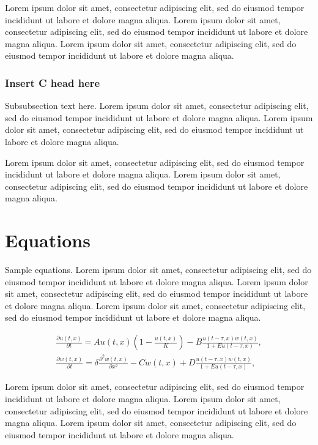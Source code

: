 \documentclass[
  journal=medium,
  manuscript=article-type,
  year=2020,
  volume=37,
]{cup-journal}
\begin{document}
 Lorem ipsum dolor sit amet, consectetur adipiscing elit, sed do eiusmod tempor incididunt ut labore et dolore magna aliqua. Lorem ipsum dolor sit amet, consectetur adipiscing elit, sed do eiusmod tempor incididunt ut labore et dolore magna aliqua. Lorem ipsum dolor sit amet, consectetur adipiscing elit, sed do eiusmod tempor incididunt ut labore et dolore magna aliqua. 

\subsubsection{Insert C head here}
Subsubsection text here. Lorem ipsum dolor sit amet, consectetur adipiscing elit, sed do eiusmod tempor incididunt ut labore et dolore magna aliqua. 
Lorem ipsum dolor sit amet, consectetur adipiscing elit, sed do eiusmod tempor incididunt ut labore et dolore magna aliqua. 

Lorem ipsum dolor sit amet, consectetur adipiscing elit, sed do eiusmod tempor incididunt ut labore et dolore magna aliqua. Lorem ipsum dolor sit amet, consectetur adipiscing elit, sed do eiusmod tempor incididunt ut labore et dolore magna aliqua. 

\section{Equations}

Sample equations. Lorem ipsum dolor sit amet, consectetur adipiscing elit, sed do eiusmod tempor incididunt ut labore et dolore magna aliqua. Lorem ipsum dolor sit amet, consectetur adipiscing elit, sed do eiusmod tempor incididunt ut labore et dolore magna aliqua. Lorem ipsum dolor sit amet, consectetur adipiscing elit, sed do eiusmod tempor incididunt ut labore et dolore magna aliqua. 


\begin{equation}
\begin{aligned}\label{eq:first}
\frac{\partial u(t,x)}{\partial t} = Au(t,x) \left(1-\frac{u(t,x)}{K}\right)
 -B\frac{u(t-\tau,x) w(t,x)}{1+Eu(t-\tau,x)},\\
\frac{\partial w(t,x)}{\partial t} =\delta \frac{\partial^2w(t,x)}{\partial x^2}-Cw(t,x)
+D\frac{u(t-\tau,x)w(t,x)}{1+Eu(t-\tau,x)},
\end{aligned}
\end{equation}

 Lorem ipsum dolor sit amet, consectetur adipiscing elit, sed do eiusmod tempor incididunt ut labore et dolore magna aliqua. Lorem ipsum dolor sit amet, consectetur adipiscing elit, sed do eiusmod tempor incididunt ut labore et dolore magna aliqua. Lorem ipsum dolor sit amet, consectetur adipiscing elit, sed do eiusmod tempor incididunt ut labore et dolore magna aliqua. 
\end{document}
